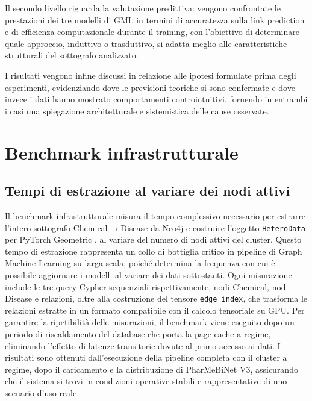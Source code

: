 Il secondo livello riguarda la valutazione predittiva: vengono confrontate le prestazioni dei tre modelli di GML in termini di accuratezza sulla link prediction e di efficienza computazionale durante il training, con l'obiettivo di determinare quale approccio, induttivo o trasduttivo, si adatta meglio alle caratteristiche strutturali del sottografo analizzato.

I risultati vengono infine discussi in relazione alle ipotesi formulate prima degli esperimenti, evidenziando dove le previsioni teoriche si sono confermate e dove invece i dati hanno mostrato comportamenti controintuitivi, fornendo in entrambi i casi una spiegazione architetturale e sistemistica delle cause osservate.


\section{Benchmark infrastrutturale}

\subsection{Tempi di estrazione al variare dei nodi attivi}

Il benchmark infrastrutturale misura il tempo complessivo necessario per estrarre l'intero sottografo Chemical$\to$Disease da Neo4j e costruire l'oggetto \texttt{HeteroData} per PyTorch Geometric \cite{fey2019fast}, al variare del numero di nodi attivi del cluster. Questo tempo di estrazione rappresenta un collo di bottiglia critico in pipeline di Graph Machine Learning su larga scala, poiché determina la frequenza con cui è possibile aggiornare i modelli al variare dei dati sottostanti. Ogni misurazione include le tre query Cypher sequenziali rispettivamente, nodi Chemical, nodi Disease e relazioni, oltre alla costruzione del tensore \texttt{edge\_index}, che trasforma le relazioni estratte in un formato compatibile con il calcolo tensoriale su GPU. Per garantire la ripetibilità delle misurazioni, il benchmark viene eseguito dopo un periodo di riscaldamento del database che porta la page cache a regime, eliminando l'effetto di latenze transitorie dovute al primo accesso ai dati. I risultati sono ottenuti dall'esecuzione della pipeline completa con il cluster a regime, dopo il caricamento e la distribuzione di PharMeBiNet V3, assicurando che il sistema si trovi in condizioni operative stabili e rappresentative di uno scenario d'uso reale.

